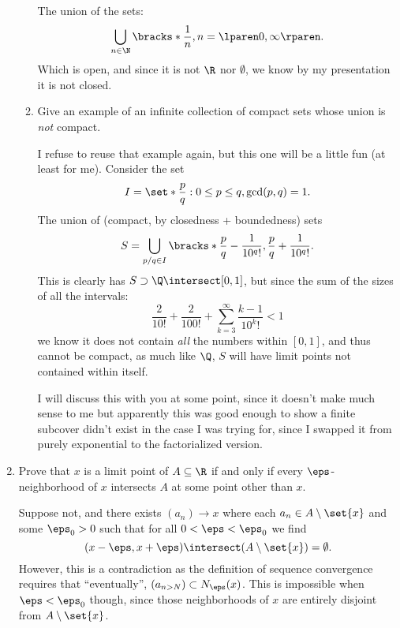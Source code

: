 \documentclass{article}
\begin{document}
\begin{enumerate}
\begin{enumerate}
                The union of the sets:
                \[ \bigcup_{n \in \N}\bracks*{\frac{1}{n}, n} = \lparen 0, \infty \rparen. \]
                Which is open, and since it is not $\R$ nor $\emptyset$, we know by my presentation it is not closed.

          \item Give an example of an infinite collection of compact sets whose union is \emph{not} compact.

                I refuse to reuse that example again, but this one will be a little fun (at least for me). Consider the set
                \[ I = \set*{ \frac{p}{q} : 0 \le p \le q, \gcd(p, q) = 1 }. \]
                The union of (compact, by closedness + boundedness) sets
                \[ S = \bigcup_{p/q \in I}\bracks*{\frac{p}{q} - \frac{1}{10^{q}!}, \frac{p}{q} + \frac{1}{10^{q}!}}. \]
                This is clearly has $S \supset \Q \intersect [0, 1] $, but since the sum of the sizes of all the intervals:
                \[ \frac{2}{10!} + \frac{2}{100!} + \sum_{k = 3}^{\infty}\frac{k - 1}{10^{k}!} < 1 \]
                we know it does not contain \emph{all} the numbers within $[0, 1]$, and thus cannot be compact,
                as much like $\Q$, $S$ will have limit points not contained within itself.

                I will discuss this with you at some point, since it doesn't make much sense to me but
                apparently this was good enough to show a finite subcover didn't exist in the case I was trying for,
                since I swapped it from purely exponential to the factorialized version.

        \end{enumerate}

  \item Prove that $x$ is a limit point of $A \subseteq \R$ if and only if every $\eps$-neighborhood of $x$
        intersects $A$ at some point other than $x$.

        Suppose not, and there exists $(a_{n}) \to x$ where each $a_{n} \in A \setminus \set{x}$ and some $\eps_{0} > 0$ such that
        for all $0 < \eps < \eps_{0}$ we find
        \[ (x - \eps, x + \eps) \intersect (A \setminus \set{x}) = \emptyset. \]
        However, this is a contradiction as the definition of sequence convergence requires that ``eventually'', $(a_{n > N}) \subset N_{\eps}(x)$.
        This is impossible when $\eps < \eps_{0}$ though, since those neighborhoods of $x$ are entirely disjoint from $A \setminus \set{x}$.



\end{enumerate}
\end{document}
